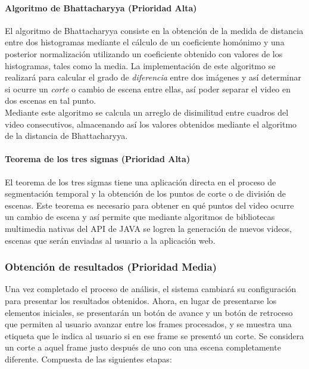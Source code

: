 \documentclass[a4paper]{article}
\begin{document}
{      \paragraph{Algoritmo de Bhattacharyya (Prioridad Alta)}
      
      El algoritmo de Bhattacharyya consiste en la obtención de la medida de distancia entre dos histogramas mediante el cálculo de un coeficiente homónimo y una posterior normalización utilizando un coeficiente obtenido con valores de los histogramas, tales como la media. La implementación de este algoritmo se realizará para calcular el grado de \textit{diferencia} entre dos imágenes y así determinar si ocurre un \textit{corte} o cambio de escena entre ellas, así poder separar el video en dos escenas en tal punto. \\
      
      Mediante este algoritmo se calcula un arreglo de disimilitud entre cuadros del video consecutivos, almacenando así los valores obtenidos mediante el algoritmo de la distancia de Bhattacharyya.  \\     
      
        \paragraph{Teorema de los tres sigmas (Prioridad Alta)}
      	
        El teorema de los tres sigmas tiene una aplicación directa en el proceso de segmentación temporal y la obtención de los puntos de corte o de división de escenas. Este teorema es necesario para obtener en qué puntos del video ocurre un cambio de escena y así permite que mediante algoritmos de bibliotecas multimedia nativas del API de JAVA se logren la generación de nuevos videos, escenas que serán enviadas al usuario  a la aplicación web. 
        
     
     \subsubsection{Obtención de resultados (Prioridad Media)}
     
        	Una vez completado el proceso de análisis, el sistema cambiará su configuración para presentar los resultados obtenidos. Ahora, en lugar de presentarse los elementos iniciales, se presentarán un botón de avance y un botón de retroceso que permiten al usuario avanzar entre los frames procesados, y se muestra una etiqueta que le indica al usuario si en ese frame se presentó un corte. Se considera un corte a aquel frame justo después de uno con una escena completamente diferente. Compuesta de las siguientes etapas: \\ 
            
}
\end{document}
